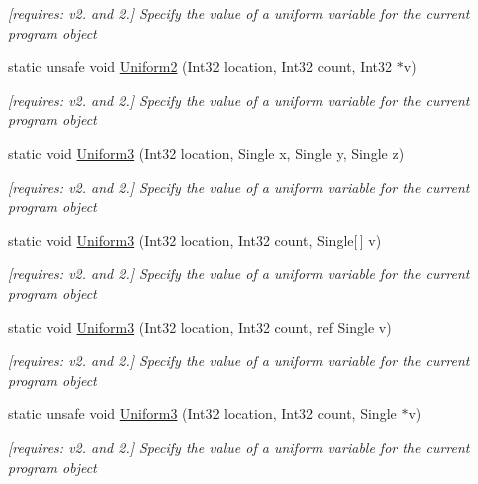 \begin{DoxyCompactItemize}
\begin{DoxyCompactList}\small\item\em \mbox{[}requires\-: v2. and 2.\mbox{]} Specify the value of a uniform variable for the current program object \end{DoxyCompactList}\item 
static unsafe void \hyperlink{class_open_t_k_1_1_graphics_1_1_e_s20_1_1_g_l_abc4f77be7375b9119184235917497836}{Uniform2} (Int32 location, Int32 count, Int32 $\ast$v)
\begin{DoxyCompactList}\small\item\em \mbox{[}requires\-: v2. and 2.\mbox{]} Specify the value of a uniform variable for the current program object \end{DoxyCompactList}\item 
static void \hyperlink{class_open_t_k_1_1_graphics_1_1_e_s20_1_1_g_l_a503bd5ca1d30b59da72a1c31a67e30e4}{Uniform3} (Int32 location, Single x, Single y, Single z)
\begin{DoxyCompactList}\small\item\em \mbox{[}requires\-: v2. and 2.\mbox{]} Specify the value of a uniform variable for the current program object \end{DoxyCompactList}\item 
static void \hyperlink{class_open_t_k_1_1_graphics_1_1_e_s20_1_1_g_l_af3a1ae12fa1bce6c18d1bdb37413743b}{Uniform3} (Int32 location, Int32 count, Single\mbox{[}$\,$\mbox{]} v)
\begin{DoxyCompactList}\small\item\em \mbox{[}requires\-: v2. and 2.\mbox{]} Specify the value of a uniform variable for the current program object \end{DoxyCompactList}\item 
static void \hyperlink{class_open_t_k_1_1_graphics_1_1_e_s20_1_1_g_l_aca67b27ea0e8898a9dac39774f0b26ee}{Uniform3} (Int32 location, Int32 count, ref Single v)
\begin{DoxyCompactList}\small\item\em \mbox{[}requires\-: v2. and 2.\mbox{]} Specify the value of a uniform variable for the current program object \end{DoxyCompactList}\item 
static unsafe void \hyperlink{class_open_t_k_1_1_graphics_1_1_e_s20_1_1_g_l_a13d0590e4db042b6c737d6f6e48482cc}{Uniform3} (Int32 location, Int32 count, Single $\ast$v)
\begin{DoxyCompactList}\small\item\em \mbox{[}requires\-: v2. and 2.\mbox{]} Specify the value of a uniform variable for the current program object \end{DoxyCompactList}\item 

\end{DoxyCompactItemize}
